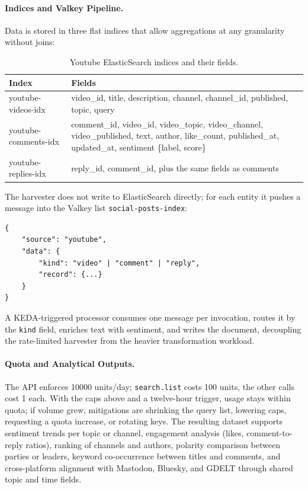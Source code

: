 \paragraph{Indices and Valkey Pipeline.}
Data is stored in three flat indices that allow aggregations at any granularity without joins:
\begin{table}[H]
\centering
\small
\begin{tabular}{p{3.4cm}p{10cm}}
\hline
\textbf{Index} & \textbf{Fields} \\
\hline
youtube-videos-idx & video\_id, title, description, channel, channel\_id, published, topic, query \\
youtube-comments-idx & comment\_id, video\_id, video\_topic, video\_channel, video\_published, text, author, like\_count, published\_at, updated\_at, sentiment \{label, score\} \\
youtube-replies-idx & reply\_id, comment\_id, plus the same fields as comments \\
\hline
\end{tabular}
\caption{Youtube ElasticSearch indices and their fields.}
\end{table}
The harvester does not write to ElasticSearch directly; for each entity it pushes a message into the Valkey list \texttt{social-posts-index}:
\begin{verbatim}
{
    "source": "youtube",
    "data": {
        "kind": "video" | "comment" | "reply",
        "record": {...}
    }
}
\end{verbatim}
A KEDA-triggered processor consumes one message per invocation, routes it by the \texttt{kind} field, enriches text with sentiment, and writes the document, decoupling the rate-limited harvester from the heavier transformation workload.

\paragraph{Quota and Analytical Outputs.}
The API enforces 10000 units/day; \texttt{search.list} costs 100 units, the other calls cost 1 each. With the caps above and a twelve-hour trigger, usage stays within quota; if volume grew, mitigations are shrinking the query list, lowering caps, requesting a quota increase, or rotating keys. The resulting dataset supports sentiment trends per topic or channel, engagement analysis (likes, comment-to-reply ratios), ranking of channels and authors, polarity comparison between parties or leaders, keyword co-occurrence between titles and comments, and cross-platform alignment with Mastodon, Bluesky, and GDELT through shared topic and time fields.



